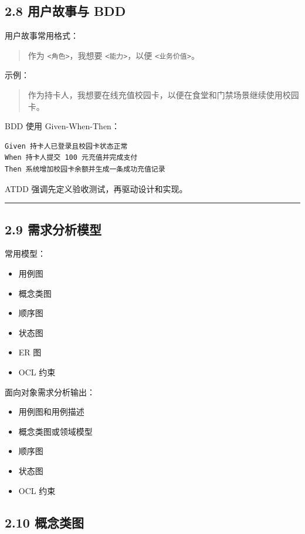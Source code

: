 \documentclass[UTF8,zihao=-4]{ctexart}
\begin{document}
\subsection{2.8 用户故事与 BDD}

用户故事常用格式：

\begin{quote}
作为 \texttt{<角色>}，我想要 \texttt{<能力>}，以便 \texttt{<业务价值>}。
\end{quote}

示例：

\begin{quote}
作为持卡人，我想要在线充值校园卡，以便在食堂和门禁场景继续使用校园卡。
\end{quote}

BDD 使用 Given-When-Then：

\small
\begin{verbatim}
Given 持卡人已登录且校园卡状态正常
When 持卡人提交 100 元充值并完成支付
Then 系统增加校园卡余额并生成一条成功充值记录
\end{verbatim}
\normalsize

ATDD 强调先定义验收测试，再驱动设计和实现。

\bigskip\hrule\bigskip

\subsection{2.9 需求分析模型}

常用模型：

\begin{itemize}
\item 用例图
\item 概念类图
\item 顺序图
\item 状态图
\item ER 图
\item OCL 约束
\end{itemize}

面向对象需求分析输出：

\begin{itemize}
\item 用例图和用例描述
\item 概念类图或领域模型
\item 顺序图
\item 状态图
\item OCL 约束
\end{itemize}

\subsection{2.10 概念类图}
\end{document}
